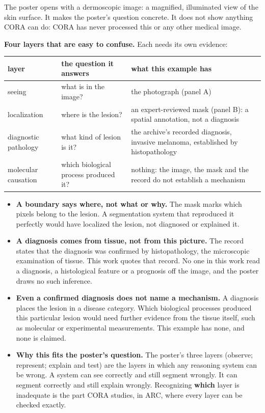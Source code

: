 \documentclass[11pt, a4paper]{article}
\begin{document}
The poster opens with a dermoscopic image: a magnified, illuminated view of the skin surface. It makes the poster's
question concrete. It does not show anything CORA can do: CORA has never processed this or any other medical image.

\textbf{Four layers that are easy to confuse.} Each needs its own evidence:

\begin{center}
\begin{tabularx}{\linewidth}{p{3.3cm}YY}
layer & the question it answers & what this example has\\[0pt]
\hline
seeing & what is in the image? & the photograph (panel A)\\[0pt]
localization & where is the lesion? & an expert-reviewed mask (panel B): a spatial annotation, not a diagnosis\\[0pt]
diagnostic pathology & what kind of lesion is it? & the archive's recorded diagnosis, invasive melanoma, established by histopathology\\[0pt]
molecular causation & which biological process produced it? & nothing: the image, the mask and the record do not establish a mechanism\\[0pt]
\end{tabularx}
\end{center}

\begin{itemize}
\item \textbf{A boundary says where, not what or why.} The mask marks which pixels belong to the lesion. A segmentation system that
reproduced it perfectly would have localized the lesion, not diagnosed or explained it.
\item \textbf{A diagnosis comes from tissue, not from this picture.} The record states that the diagnosis was confirmed by
histopathology, the microscopic examination of tissue. This work quotes that record. No one in this work read a
diagnosis, a histological feature or a prognosis off the image, and the poster draws no such inference.
\item \textbf{Even a confirmed diagnosis does not name a mechanism.} A diagnosis places the lesion in a disease category. Which
biological processes produced this particular lesion would need further evidence from the tissue itself, such as
molecular or experimental measurements. This example has none, and none is claimed.
\item \textbf{Why this fits the poster's question.} The poster's three layers (observe; represent; explain and test) are the
layers in which any reasoning system can be wrong. A system can see correctly and still segment wrongly. It can
segment correctly and still explain wrongly. Recognizing \textbf{which} layer is inadequate is the part CORA studies, in ARC,
where every layer can be checked exactly.
\end{itemize}
\end{document}
